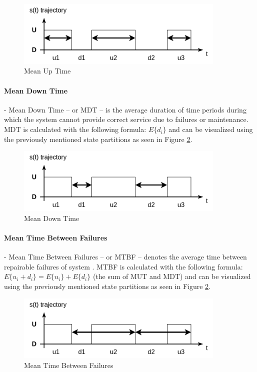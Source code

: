 \begin{figure}[h]
	\centering
	\includegraphics[width=100mm, keepaspectratio]{figures/MUT.png}
	\caption{ Mean Up Time \cite{DependabilityBMEMIT} }
	\label{fig:mut}
\end{figure}

\paragraph{Mean Down Time} - Mean Down Time -- or MDT -- is the average duration of time periods during which the system cannot provide correct service due to failures or maintenance. MDT is calculated with the following formula: \(E\{d_i\}\) and can be visualized using the previously mentioned state partitions as seen in Figure \ref{fig:mdt}.

\begin{figure}[h]
	\centering
	\includegraphics[width=100mm, keepaspectratio]{figures/MDT.png}
	\caption{ Mean Down Time \cite{DependabilityBMEMIT} }
	\label{fig:mdt}
\end{figure}

\paragraph{Mean Time Between Failures} - Mean Time Between Failures -- or MTBF -- denotes the average time between repairable failures of system \cite{KPIMetrics}. MTBF is calculated with the following formula: \(E\{u_i + d_i\} = E\{u_i\} + E\{d_i\}\) (the sum of MUT and MDT) and can be visualized using the previously mentioned state partitions as seen in Figure \ref{fig:mdt}.

\begin{figure}[h]
	\centering
	\includegraphics[width=100mm, keepaspectratio]{figures/MTBF.png}
	\caption{ Mean Time Between Failures \cite{DependabilityBMEMIT} }
	\label{fig:mtbf}
\end{figure}

